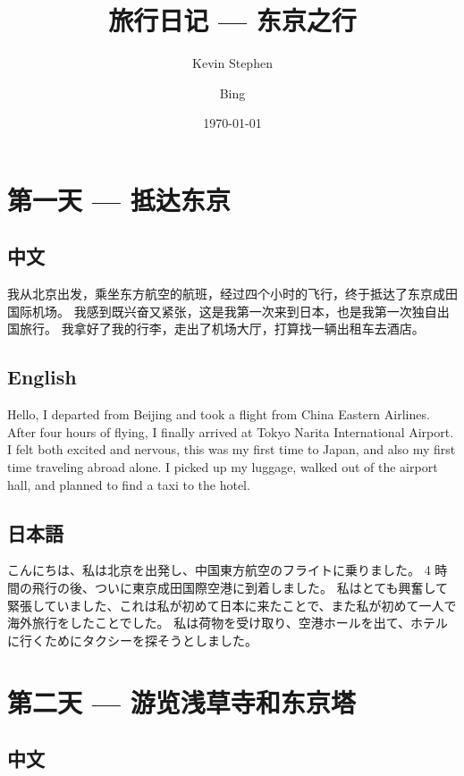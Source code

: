 \documentclass{kspaper}
\title{旅行日记 --- 东京之行}
\author{Kevin Stephen \and Bing}
\date{\today}
\begin{document}
\maketitle

\tableofcontents

\clearpage


\section{第一天 --- 抵达东京}

\subsection{中文}

我从北京出发，乘坐东方航空的航班，经过四个小时的飞行，终于抵达了东京成田国际机场。
我感到既兴奋又紧张，这是我第一次来到日本，也是我第一次独自出国旅行。
我拿好了我的行李，走出了机场大厅，打算找一辆出租车去酒店。

\subsection{English}

Hello, I departed from Beijing and took a flight from China Eastern Airlines.
After four hours of flying, I finally arrived at Tokyo Narita International Airport.
I felt both excited and nervous, this was my first time to Japan, and also my first time traveling abroad alone.
I picked up my luggage, walked out of the airport hall, and planned to find a taxi to the hotel.

\subsection{日本語}

こんにちは、私は北京を出発し、中国東方航空のフライトに乗りました。
4 時間の飛行の後、ついに東京成田国際空港に到着しました。
私はとても興奮して緊張していました、これは私が初めて日本に来たことで、また私が初めて一人で海外旅行をしたことでした。
私は荷物を受け取り、空港ホールを出て、ホテルに行くためにタクシーを探そうとしました。

\section{第二天 --- 游览浅草寺和东京塔}

\subsection{中文}
\end{document}
